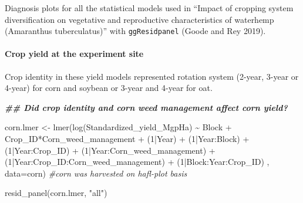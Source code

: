 \documentclass[
]{article}
\author{}
\date{\vspace{-2.5em}}
\newenvironment{Shaded}{\begin{snugshade}}{\end{snugshade}}
\newcommand{\AttributeTok}[1]{\textcolor[rgb]{0.77,0.63,0.00}{#1}}
\newcommand{\CommentTok}[1]{\textcolor[rgb]{0.56,0.35,0.01}{\textit{#1}}}
\newcommand{\DecValTok}[1]{\textcolor[rgb]{0.00,0.00,0.81}{#1}}
\newcommand{\DocumentationTok}[1]{\textcolor[rgb]{0.56,0.35,0.01}{\textbf{\textit{#1}}}}
\newcommand{\FunctionTok}[1]{\textcolor[rgb]{0.00,0.00,0.00}{#1}}
\newcommand{\NormalTok}[1]{#1}
\newcommand{\OtherTok}[1]{\textcolor[rgb]{0.56,0.35,0.01}{#1}}
\newcommand{\SpecialCharTok}[1]{\textcolor[rgb]{0.00,0.00,0.00}{#1}}
\newcommand{\StringTok}[1]{\textcolor[rgb]{0.31,0.60,0.02}{#1}}
\begin{document}
Diagnosis plots for all the statistical models used in ``Impact of cropping system diversification on vegetative and reproductive characteristics of waterhemp (Amaranthus tuberculatus)'' with \texttt{ggResidpanel} (Goode and Rey 2019).

\hypertarget{crop-yield-at-the-experiment-site}{%
\paragraph*{Crop yield at the experiment site}\label{crop-yield-at-the-experiment-site}}

Crop identity in these yield models represented rotation system (2-year, 3-year or 4-year) for corn and soybean or 3-year and 4-year for oat.

\begin{Shaded}
\begin{Highlighting}[]
\DocumentationTok{\#\# Did crop identity and corn weed management affect corn yield?}

\NormalTok{corn.lmer }\OtherTok{\textless{}{-}} \FunctionTok{lmer}\NormalTok{(}\FunctionTok{log}\NormalTok{(Standardized\_yield\_MgpHa) }\SpecialCharTok{\textasciitilde{}}\NormalTok{ Block }\SpecialCharTok{+} 
\NormalTok{                    Crop\_ID}\SpecialCharTok{*}\NormalTok{Corn\_weed\_management }\SpecialCharTok{+} 
\NormalTok{                    (}\DecValTok{1}\SpecialCharTok{|}\NormalTok{Year) }\SpecialCharTok{+}
\NormalTok{                    (}\DecValTok{1}\SpecialCharTok{|}\NormalTok{Year}\SpecialCharTok{:}\NormalTok{Block) }\SpecialCharTok{+} 
\NormalTok{                    (}\DecValTok{1}\SpecialCharTok{|}\NormalTok{Year}\SpecialCharTok{:}\NormalTok{Crop\_ID) }\SpecialCharTok{+} 
\NormalTok{                    (}\DecValTok{1}\SpecialCharTok{|}\NormalTok{Year}\SpecialCharTok{:}\NormalTok{Corn\_weed\_management) }\SpecialCharTok{+} 
\NormalTok{                    (}\DecValTok{1}\SpecialCharTok{|}\NormalTok{Year}\SpecialCharTok{:}\NormalTok{Crop\_ID}\SpecialCharTok{:}\NormalTok{Corn\_weed\_management)  }\SpecialCharTok{+}
\NormalTok{                    (}\DecValTok{1}\SpecialCharTok{|}\NormalTok{Block}\SpecialCharTok{:}\NormalTok{Year}\SpecialCharTok{:}\NormalTok{Crop\_ID) ,}
  \AttributeTok{data=}\NormalTok{corn) }\CommentTok{\#corn was harvested on hafl{-}plot basis}

\FunctionTok{resid\_panel}\NormalTok{(corn.lmer, }\StringTok{"all"}\NormalTok{)}
\end{Highlighting}
\end{Shaded}
\end{document}
